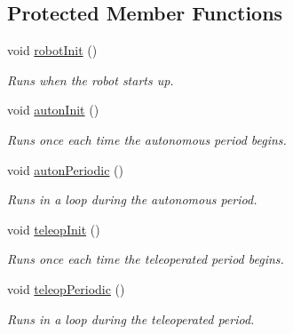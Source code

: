 \subsection*{Protected Member Functions}
\begin{DoxyCompactItemize}
\item 
\mbox{\label{class_robot_a0ade19d412e58249d9f7a138d306130c}} 
void \mbox{\hyperlink{class_robot_a0ade19d412e58249d9f7a138d306130c}{robot\+Init}} ()
\begin{DoxyCompactList}\small\item\em Runs when the robot starts up. \end{DoxyCompactList}\item 
\mbox{\label{class_robot_af5bd4d345ec522b70bdc5cf2b17ffa49}} 
void \mbox{\hyperlink{class_robot_af5bd4d345ec522b70bdc5cf2b17ffa49}{auton\+Init}} ()
\begin{DoxyCompactList}\small\item\em Runs once each time the autonomous period begins. \end{DoxyCompactList}\item 
\mbox{\label{class_robot_a51cab9afb43b369593ca189101b25b26}} 
void \mbox{\hyperlink{class_robot_a51cab9afb43b369593ca189101b25b26}{auton\+Periodic}} ()
\begin{DoxyCompactList}\small\item\em Runs in a loop during the autonomous period. \end{DoxyCompactList}\item 
\mbox{\label{class_robot_a8fc4fbb8f758d7223d062e1b4a915232}} 
void \mbox{\hyperlink{class_robot_a8fc4fbb8f758d7223d062e1b4a915232}{teleop\+Init}} ()
\begin{DoxyCompactList}\small\item\em Runs once each time the teleoperated period begins. \end{DoxyCompactList}\item 
\mbox{\label{class_robot_a78f62f5d6eb05e27bfa1998fc35a519c}} 
void \mbox{\hyperlink{class_robot_a78f62f5d6eb05e27bfa1998fc35a519c}{teleop\+Periodic}} ()
\begin{DoxyCompactList}\small\item\em Runs in a loop during the teleoperated period. \end{DoxyCompactList}\item 

\end{DoxyCompactItemize}
